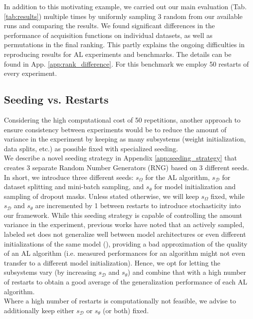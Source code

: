 \documentclass[]{article}
\begin{document}
In addition to this motivating example, we carried out our main evaluation (Tab. \ref{tab:results}) multiple times by uniformly sampling 3 random from our available runs and comparing the results.
We found significant differences in the performance of acquisition functions on individual datasets, as well as permutations in the final ranking.
This partly explains the ongoing difficulties in reproducing results for AL experiments and benchmarks.
The details can be found in App. \ref{app:rank_difference}.
For this benchmark we employ 50 restarts of every experiment.


\subsection{Seeding vs. Restarts}\label{sec:reproducibility}
Considering the high computational cost of 50 repetitions, another approach to ensure consistency between experiments would be to reduce the amount of variance in the experiment by keeping as many subsystems (weight initialization, data splits, etc.) as possible fixed with specialized seeding. \\
We describe a novel seeding strategy in Appendix \ref{app:seeding_strategy} that creates 3 separate Random Number Generators (RNG) based on 3 different seeds.
In short, we introduce three different seeds: $s_\Omega$ for the AL algorithm, $s_\mathcal{D}$ for dataset splitting and mini-batch sampling, and $s_\theta$ for model initialization and sampling of dropout masks.
Unless stated otherwise, we will keep $s_\Omega$ fixed, while $s_\mathcal{D}$ and $s_\theta$ are incremented by 1 between restarts to introduce stochasticity into our framework.
While this seeding strategy is capable of controlling the amount variance in the experiment, previous works have noted that an actively sampled, labeled set does not generalize well between model architectures or even different initializations of the same model (\cite{zhou2021towards, lowell2018practical}), providing a bad approximation of the quality of an AL algorithm (i.e. measured performances for an algorithm might not even transfer to a different model initialization).
Hence, we opt for letting the subsystems vary (by increasing $s_\mathcal{D}$ and $s_\theta$) and combine that with a high number of restarts to obtain a good average of the generalization performance of each AL algorithm. \\
Where a high number of restarts is computationally not feasible, we advise to additionally keep either $s_\mathcal{D}$ or $s_\theta$ (or both) fixed.
\end{document}

